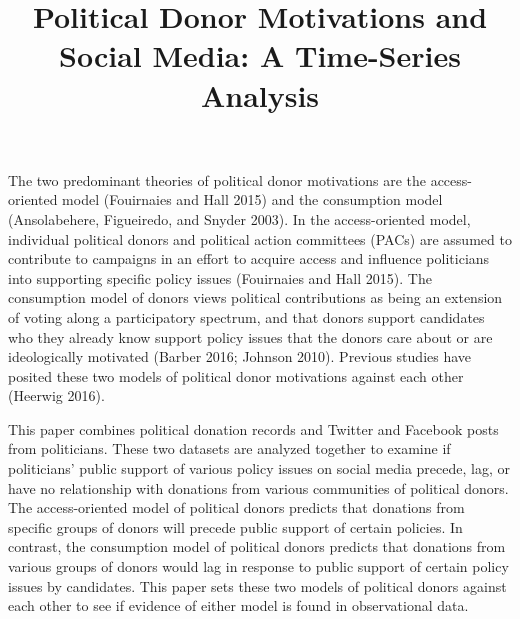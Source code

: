 \documentclass[12pt,]{article}
\title{Political Donor Motivations and Social Media: A Time-Series Analysis  }
\author{\Large \vspace{0.05in} \newline\normalsize\emph{}  }
\date{}
\newcommand*{\authorfont}{\fontfamily{phv}\selectfont}
\begin{document}
	
%

{%
\setlength{\parindent}{0pt}
\thispagestyle{plain}
{\fontsize{18}{20}\selectfont\raggedright 
\maketitle  %

}

{
   \vskip 13.5pt\relax \normalsize\fontsize{11}{12} 
\textbf{\authorfont } \hskip 15pt \emph{\small }   

}

}






\vskip -8.5pt



\noindent \doublespacing 

The two predominant theories of political donor motivations are the
access-oriented model (Fouirnaies and Hall 2015) and the consumption
model (Ansolabehere, Figueiredo, and Snyder 2003). In the
access-oriented model, individual political donors and political action
committees (PACs) are assumed to contribute to campaigns in an effort to
acquire access and influence politicians into supporting specific policy
issues (Fouirnaies and Hall 2015). The consumption model of donors views
political contributions as being an extension of voting along a
participatory spectrum, and that donors support candidates who they
already know support policy issues that the donors care about or are
ideologically motivated (Barber 2016; Johnson 2010). Previous studies
have posited these two models of political donor motivations against
each other (Heerwig 2016).

This paper combines political donation records and Twitter and Facebook
posts from politicians. These two datasets are analyzed together to
examine if politicians' public support of various policy issues on
social media precede, lag, or have no relationship with donations from
various communities of political donors. The access-oriented model of
political donors predicts that donations from specific groups of donors
will precede public support of certain policies. In contrast, the
consumption model of political donors predicts that donations from
various groups of donors would lag in response to public support of
certain policy issues by candidates. This paper sets these two models of
political donors against each other to see if evidence of either model
is found in observational data.
\end{document}

